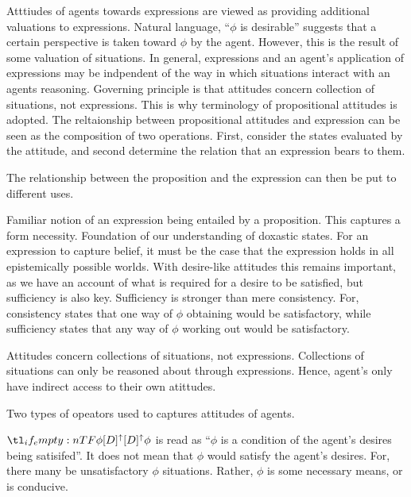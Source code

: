 \documentclass[10pt]{article}
\begin{document}
Atttiudes of agents towards expressions are viewed as providing additional valuations to expressions.
Natural language, ``\(\phi\) is desirable'' suggests that a certain perspective is taken toward \(\phi\) by the agent.
However, this is the result of some valuation of situations.
In general, expressions and an agent's application of expressions may be indpendent of the way in which situations interact with an agents reasoning.
Governing principle is that attitudes concern collection of situations, not expressions.
This is why terminology of propositional attitudes is adopted.
The reltaionship between propositional attitudes and expression can be seen as the composition of two operations.
First, consider the states evaluated by the attitude, and second determine the relation that an expression bears to them.

The relationship between the proposition and the expression can then be put to different uses.

Familiar notion of an expression being entailed by a proposition.
This captures a form necessity.
Foundation of our understanding of doxastic states.
For an expression to capture belief, it must be the case that the expression holds in all epistemically possible worlds.
With desire-like attitudes this remains important, as we have an account of what is required for a desire to be satisfied, but sufficiency is also key.
Sufficiency is stronger than mere consistency.
For, consistency states that one way of \(\phi\) obtaining would be satisfactory, while sufficiency states that any way of \(\phi\) working out would be satisfactory.

Attitudes concern collections of situations, not expressions.
Collections of situations can only be reasoned about through expressions.
Hence, agent's only have indirect access to their own atittudes.







Two types of opeators used to captures attitudes of agents.




\(\lattu[D]{\phi}\) is read as ``\(\phi\) is a condition of the agent's desires being satisifed''.
It does not mean that \(\phi\) would satisfy the agent's desires.
For, there many be unsatisfactory \(\phi\) situations.
Rather, \(\phi\) is some necessary means, or is conducive.
\end{document}
